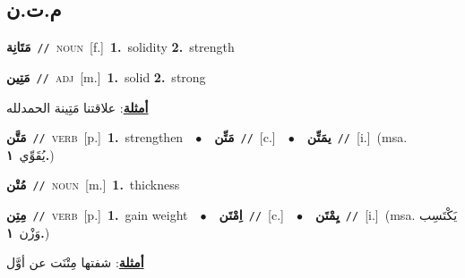 \documentclass[10pt,a4paper,twoside]{article} %
\begin{document}
\begin{multicols}{2}
\vspace{-3mm}
\subsection*{\color{blue}\foreignlanguage{arabic}{م.ت.ن}\color{blue}{}} 

{\setlength\topsep{0pt}\textbf{\foreignlanguage{arabic}{مَتَانِة}}\ {\color{gray}\texttt{//}\color{black}}\ \textsc{noun}\ [f.]\ \textbf{1.}~solidity  \textbf{2.}~strength\ } \vspace{2mm}

{\setlength\topsep{0pt}\textbf{\foreignlanguage{arabic}{مَتِين}}\ {\color{gray}\texttt{//}\color{black}}\ \textsc{adj}\ [m.]\ \textbf{1.}~solid  \textbf{2.}~strong\  \begin{flushright}\color{gray}\foreignlanguage{arabic}{\textbf{\underline{\foreignlanguage{arabic}{أمثلة}}}: علاقتنا مَتِينة الحمدلله}\end{flushright}\color{black}} \vspace{2mm}

{\setlength\topsep{0pt}\textbf{\foreignlanguage{arabic}{مَتَّن}}\ {\color{gray}\texttt{//}\color{black}}\ \textsc{verb}\ [p.]\ \textbf{1.}~strengthen\ \ $\bullet$\ \ \setlength\topsep{0pt}\textbf{\foreignlanguage{arabic}{مَتِّن}}\ {\color{gray}\texttt{//}\color{black}}\ [c.]\ \ $\bullet$\ \ \setlength\topsep{0pt}\textbf{\foreignlanguage{arabic}{يمَتِّن}}\ {\color{gray}\texttt{//}\color{black}}\ [i.]\ \color{gray}(msa. \foreignlanguage{arabic}{يُقَوِّي}~\foreignlanguage{arabic}{\textbf{١.}})\color{black}\ } \vspace{2mm}

{\setlength\topsep{0pt}\textbf{\foreignlanguage{arabic}{مُتْن}}\ {\color{gray}\texttt{//}\color{black}}\ \textsc{noun}\ [m.]\ \textbf{1.}~thickness\ } \vspace{2mm}

{\setlength\topsep{0pt}\textbf{\foreignlanguage{arabic}{مِتِن}}\ {\color{gray}\texttt{//}\color{black}}\ \textsc{verb}\ [p.]\ \textbf{1.}~gain weight\ \ $\bullet$\ \ \setlength\topsep{0pt}\textbf{\foreignlanguage{arabic}{اِمْتَن}}\ {\color{gray}\texttt{//}\color{black}}\ [c.]\ \ $\bullet$\ \ \setlength\topsep{0pt}\textbf{\foreignlanguage{arabic}{يِمْتَن}}\ {\color{gray}\texttt{//}\color{black}}\ [i.]\ \color{gray}(msa. \foreignlanguage{arabic}{يَكْتَسِب وَزْن}~\foreignlanguage{arabic}{\textbf{١.}})\color{black}\  \begin{flushright}\color{gray}\foreignlanguage{arabic}{\textbf{\underline{\foreignlanguage{arabic}{أمثلة}}}: شفتها مِتْنَت عن أوَّل}\end{flushright}\color{black}} \vspace{2mm}


\end{multicols}
\end{document}
